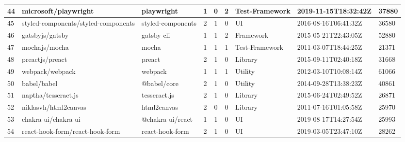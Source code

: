 \begin{landscape}
\begin{table}[]
{\begin{tabular}{lllccclll}
                44 & microsoft/playwright                & playwright            & 1                      & 0                 & 2                 & Test-Framework    & 2019-11-15T18:32:42Z & 37880          \\ \hline
                45 & styled-components/styled-components & styled-components     & 2                      & 1                 & 0                 & UI                & 2016-08-16T06:41:32Z & 36580          \\ \hline
                46 & gatsbyjs/gatsby                     & gatsby-cli            & 1                      & 1                 & 2                 & Framework         & 2015-05-21T22:43:05Z & 52880          \\ \hline
                47 & mochajs/mocha                       & mocha                 & 1                      & 1                 & 1                 & Test-Framework    & 2011-03-07T18:44:25Z & 21371          \\ \hline
                48 & preactjs/preact                     & preact                & 2                      & 1                 & 0                 & Library           & 2015-09-11T02:40:18Z & 31668          \\ \hline
                49 & webpack/webpack                     & webpack               & 1                      & 1                 & 1                 & Utility           & 2012-03-10T10:08:14Z & 61066          \\ \hline
                50 & babel/babel                         & @babel/core           & 2                      & 1                 & 0                 & Utility           & 2014-09-28T13:38:23Z & 40861          \\ \hline
                51 & naptha/tesseract.js                 & tesseract.js          & 2                      & 1                 & 0                 & Library           & 2015-06-24T02:49:52Z & 26871          \\ \hline
                52 & niklasvh/html2canvas                & html2canvas           & 2                      & 0                 & 0                 & Library           & 2011-07-16T01:05:58Z & 25970          \\ \hline
                53 & chakra-ui/chakra-ui                 & @chakra-ui/react      & 1                      & 1                 & 0                 & UI                & 2019-08-17T14:27:54Z & 25993          \\ \hline
                54 & react-hook-form/react-hook-form     & react-hook-form       & 2                      & 1                 & 0                 & UI                & 2019-03-05T23:47:10Z & 28262          \\ \hline

\end{tabular}}
\end{table}
\end{landscape}

